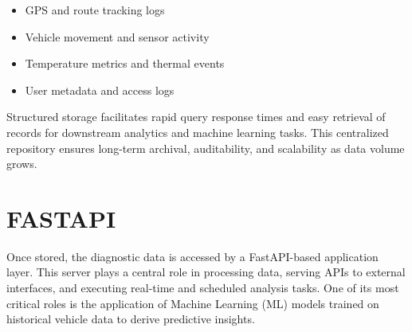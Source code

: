     \begin{itemize}
        \item GPS and route tracking logs
        \item Vehicle movement and sensor activity
        \item Temperature metrics and thermal events
        \item User metadata and access logs
    \end{itemize}
    Structured storage facilitates rapid query response times and easy retrieval of records for downstream analytics and machine learning tasks. This centralized repository ensures long-term archival, auditability, and scalability as data volume grows.

\section{FASTAPI}
    Once stored, the diagnostic data is accessed by a FastAPI-based application layer. This server plays a central role in processing data, serving APIs to external interfaces, and executing real-time and scheduled analysis tasks. One of its most critical roles is the application of Machine Learning (ML) models trained on historical vehicle data to derive predictive insights.
